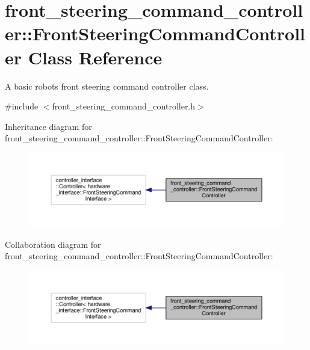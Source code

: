 \hypertarget{classfront__steering__command__controller_1_1FrontSteeringCommandController}{}\section{front\+\_\+steering\+\_\+command\+\_\+controller\+:\+:Front\+Steering\+Command\+Controller Class Reference}
\label{classfront__steering__command__controller_1_1FrontSteeringCommandController}


A basic robot\textquotesingle{}s front steering command controller class.  




{\ttfamily \#include $<$front\+\_\+steering\+\_\+command\+\_\+controller.\+h$>$}



Inheritance diagram for front\+\_\+steering\+\_\+command\+\_\+controller\+:\+:Front\+Steering\+Command\+Controller\+:\nopagebreak
\begin{figure}[H]
\begin{center}
\leavevmode
\includegraphics[width=350pt]{classfront__steering__command__controller_1_1FrontSteeringCommandController__inherit__graph}
\end{center}
\end{figure}


Collaboration diagram for front\+\_\+steering\+\_\+command\+\_\+controller\+:\+:Front\+Steering\+Command\+Controller\+:\nopagebreak
\begin{figure}[H]
\begin{center}
\leavevmode
\includegraphics[width=350pt]{classfront__steering__command__controller_1_1FrontSteeringCommandController__coll__graph}
\end{center}
\end{figure}
